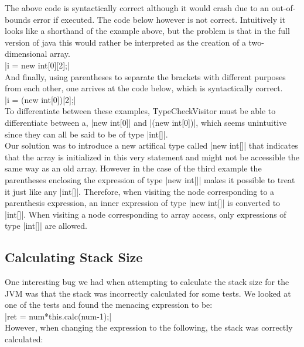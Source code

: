 \documentclass[paper=a4, fontsize=11pt]{scrartcl} %
\numberwithin{equation}{section} %
\numberwithin{figure}{section} %
\numberwithin{table}{section} %
\begin{document}
The above code is syntactically correct although it would crash due to an out-of-bounds error if executed.
The code below however is not correct.
Intuitively it looks like a shorthand of the example above, but the problem is that in the full version of java this would rather be interpreted as the creation of a two-dimensional array.\\

|i = new int[0][2];|\\

And finally, using parentheses to separate the brackets with different purposes from each other, one arrives at the code below, which is syntactically correct.\\

|i = (new int[0])[2];|\\

To differentiate between these examples, TypeCheckVisitor must be able to differentiate between a, |new int[0]| and |(new int[0])|, which seems unintuitive since they can all be said to be of type |int[]|.\\

Our solution was to introduce a new artifical type called |new int[]| that indicates that the array is initialized in this very statement and might not be accessible the same way as an old array.
However in the case of the third example the parentheses enclosing the expression of type |new int[]| makes it possible to treat it just like any |int[]|.
Therefore, when visiting the node corresponding to a parenthesis expression, an inner expression of type |new int[]| is converted to |int[]|.
When visiting a node corresponding to array access, only expressions of type |int[]| are allowed.

\subsection{Calculating Stack Size}

One interesting bug we had when attempting to calculate the stack size for the JVM was that the stack was incorrectly calculated for some tests.
We looked at one of the tests and found the menacing expression to be:\\

|ret = num*this.calc(num-1);|\\

However, when changing the expression to the following, the stack was correctly calculated:\\
\end{document}
